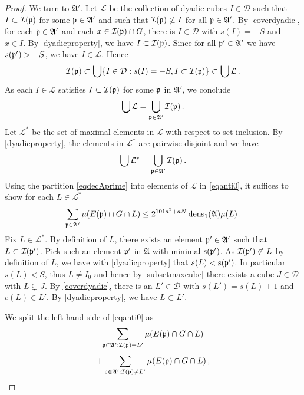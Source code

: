 \begin{proof}
We turn to $\mathfrak{A}'$.
Let $\mathcal{L}$ be the collection of dyadic cubes $I\in\mathcal{D}$ such that $I\subset {\mathcal{I}}({\mathfrak p})$
for some ${\mathfrak p}\in\mathfrak{A}'$ and such that ${\mathcal{I}}({\mathfrak p})\not \subset I$ for all ${\mathfrak p}\in\mathfrak{A}'$.
By \eqref{coverdyadic}, for each ${\mathfrak p} \in \mathfrak{A}'$
and each $x\in {\mathcal{I}}({\mathfrak p})\cap G$, there is $I\in \mathcal{D}$ with $s(I)=-S$ and $x\in I$.
By \eqref{dyadicproperty}, we have $I\subset {\mathcal{I}}({\mathfrak p})$. Since for all ${\mathfrak p}' \in \mathfrak{A}'$ we
have $s({\mathfrak p}') > -S$, we have $I \in \mathcal{L}$. Hence
\begin{equation}
    {\mathcal{I}}({\mathfrak p})\subset \bigcup\{I\in \mathcal{D}: s(I)=-S, I\subset {\mathcal{I}}({\mathfrak p})\}\subset \bigcup \mathcal{L}\, .
\end{equation}
As each $I\in \mathcal{L}$ satisfies $I\subset {\mathcal{I}}({\mathfrak p})$ for some ${\mathfrak p}$ in $\mathfrak{A'}$, we conclude
\begin{equation}
    \bigcup\mathcal{L}=\bigcup_{{\mathfrak p} \in \mathfrak{A}'}{\mathcal{I}}({\mathfrak p})\, .
\end{equation}
Let $\mathcal{L}^*$ be the set of maximal elements in $\mathcal{L}$ with respect to set inclusion.
By \eqref{dyadicproperty}, the elements in $\mathcal{L}^*$ are pairwise disjoint and we have
 \begin{equation}\label{eqdecAprime}
\bigcup\mathcal{L}^*=\bigcup_{{\mathfrak p} \in \mathfrak{A}'}{\mathcal{I}}({\mathfrak p})\, .
   \end{equation}
Using the partition \eqref{eqdecAprime} into elements of $\mathcal{L}$ in \eqref{eqanti0}, it suffices to show for each $L\in \mathcal{L}^*$
\begin{equation}\label{eqanti0}
    \sum_{{\mathfrak p}\in\mathfrak{A}'}\mu(E({\mathfrak p})\cap G \cap L)
    \le
    2^{101a^3+aN}
    \operatorname{\operatorname{dens}}_1(\mathfrak{A})\mu(L)\,.
\end{equation}
Fix $L\in \mathcal{L}^*$. By definition of $L$, there exists an element ${\mathfrak p}'\in \mathfrak{A}'$
such that $L\subset {\mathcal{I}}({\mathfrak p}')$. Pick such an element ${\mathfrak p}'$ in $\mathfrak{A}$ with
minimal ${\mathrm{s}}({\mathfrak p}')$. As ${\mathcal{I}}({\mathfrak p}')\not \subset L$ by definition of $L$,
we have with \eqref{dyadicproperty} that $s(L)< {\mathrm{s}}({\mathfrak p}')$.
In particular $s(L)<S$, thus $L \ne I_0$ and hence by \eqref{subsetmaxcube}
there exists a cube $J \in \mathcal{D}$ with $L \subsetneq J$.
By \eqref{coverdyadic}, there is an $L'\in \mathcal{D}$ with $s(L')=s(L)+1$ and $c(L)\in L'$.
By \eqref{dyadicproperty}, we have $L\subset L'$.

We split the left-hand side of \eqref{eqanti0} as
\begin{equation}\label{eqanti1}
    \sum_{{\mathfrak p}\in\mathfrak{A}':{\mathcal{I}}({\mathfrak p})=L'}\mu(E({\mathfrak p})\cap G\cap L)
\end{equation}
\begin{equation}\label{eqanti2}
    +
     \sum_{{\mathfrak p}\in\mathfrak{A}':{\mathcal{I}}({\mathfrak p})\neq L'}\mu(E({\mathfrak p})\cap G\cap L)\, ,
\end{equation}


\end{proof}
